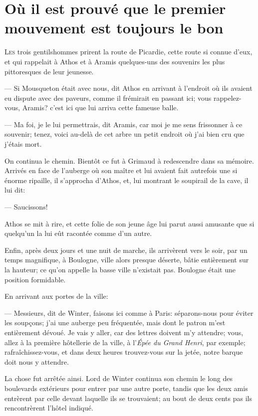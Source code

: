 \chapter{Où il est prouvé que le premier mouvement est toujours le bon}

\lettrine{L}{es} trois gentilshommes prirent la route de Picardie, cette route si connue d'eux, et qui rappelait à Athos et à Aramis quelques-uns des souvenirs les plus pittoresques de leur jeunesse.

\zz
— Si Mousqueton était avec nous, dit Athos en arrivant à l'endroit où ils avaient eu dispute avec des paveurs, comme il frémirait en passant ici; vous rappelez-vous, Aramis? c'est ici que lui arriva cette fameuse balle.

— Ma foi, je le lui permettrais, dit Aramis, car moi je me sens frissonner à ce souvenir; tenez, voici au-delà de cet arbre un petit endroit où j'ai bien cru que j'étais mort.

On continua le chemin. Bientôt ce fut à Grimaud à redescendre dans sa mémoire. Arrivés en face de l'auberge où son maître et lui avaient fait autrefois une si énorme ripaille, il s'approcha d'Athos, et, lui montrant le soupirail de la cave, il lui dit:

— Saucissons!

Athos se mit à rire, et cette folie de son jeune âge lui parut aussi amusante que si quelqu'un la lui eût racontée comme d'un autre.

Enfin, après deux jours et une nuit de marche, ils arrivèrent vers le soir, par un temps magnifique, à Boulogne, ville alors presque déserte, bâtie entièrement sur la hauteur; ce qu'on appelle la basse ville n'existait pas. Boulogne était une position formidable.

En arrivant aux portes de la ville:

— Messieurs, dit de Winter, faisons ici comme à Paris: séparons-nous pour éviter les soupçons; j'ai une auberge peu fréquentée, mais dont le patron m'est entièrement dévoué. Je vais y aller, car des lettres doivent m'y attendre; vous, allez à la première hôtellerie de la ville, à l'\textit{Épée du Grand Henri}, par exemple; rafraîchissez-vous, et dans deux heures trouvez-vous sur la jetée, notre barque doit nous y attendre.

La chose fut arrêtée ainsi. Lord de Winter continua son chemin le long des boulevards extérieurs pour entrer par une autre porte, tandis que les deux amis entrèrent par celle devant laquelle ils se trouvaient; au bout de deux cents pas ils rencontrèrent l'hôtel indiqué.

